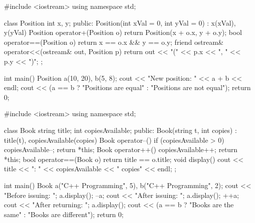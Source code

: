 \outputlabel
{}


\codelabel

\begin{code}
#include <iostream>
using namespace std;

class Position {
    int x, y;
public:
    Position(int xVal = 0, int yVal = 0) : x(xVal), y(yVal) {}
    Position operator+(Position o) { return Position(x + o.x, y + o.y); }
    bool operator==(Position o) { return x == o.x && y == o.y; }
    friend ostream& operator<<(ostream& out, Position p) {
        return out << "(" << p.x << ", " << p.y << ")";
    }
};

int main() {
    Position a(10, 20), b(5, 8);
    cout << "New position: " << a + b << endl;
    cout << (a == b ? "Positions are equal" : "Positions are not equal");
    return 0;
}
\end{code}

\outputlabel
{}


\codelabel

\begin{code}
#include <iostream>
using namespace std;

class Book {
    string title; int copiesAvailable;
public:
    Book(string t, int copies) : title(t), copiesAvailable(copies) {}
    Book operator--() { if (copiesAvailable > 0) copiesAvailable--; return *this; }
    Book operator++() { copiesAvailable++; return *this; }
    bool operator==(Book o) { return title == o.title; }
    void display() { cout << title << ": " << copiesAvailable << " copies" << endl; }
};

int main() {
    Book a("C++ Programming", 5), b("C++ Programming", 2);
    cout << "Before issuing: "; a.display();
    --a; cout << "After issuing: "; a.display();
    ++a; cout << "After returning: "; a.display();
    cout << (a == b ? "Books are the same" : "Books are different");
    return 0;
}
\end{code}

